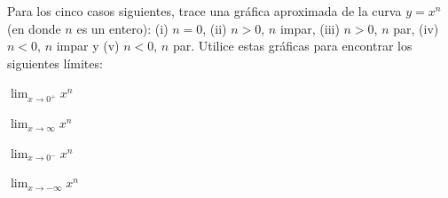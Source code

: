 \item Para los cinco casos siguientes, trace una gráfica aproximada de la curva $y = x^n$ (en donde $n$ es un entero): (i) $n = 0$, (ii) $n > 0$, $n$ impar, (iii) $n > 0$, $n$ par, (iv) $n < 0$, $n$ impar y (v) $n < 0$, $n$ par. Utilice estas gráficas para encontrar los siguientes límites:
    \begin{enumerate}
        \begin{minipage}{0.45\textwidth}
        \item[(a)] $\displaystyle \lim_{x \to 0^+} x^n$
        \item[(c)] $\displaystyle \lim_{x \to \infty} x^n$
        \end{minipage}%
        \begin{minipage}{0.45\textwidth}
        \item[(b)] $\displaystyle \lim_{x \to 0^-} x^n$
        \item[(d)] $\displaystyle \lim_{x \to -\infty} x^n$
        \end{minipage}
    \end{enumerate}
